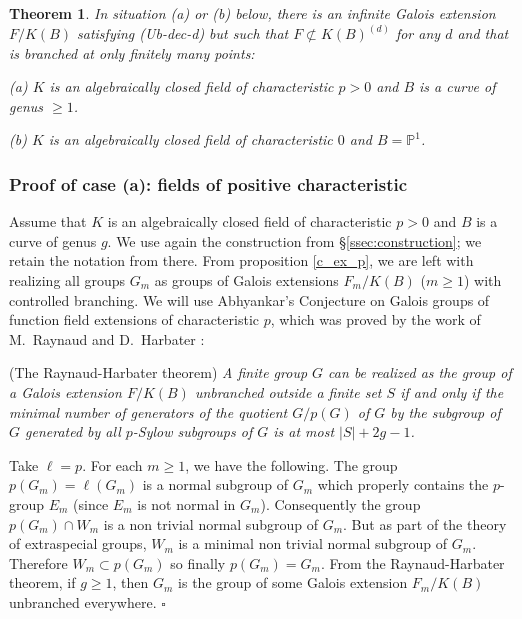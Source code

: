 \documentclass[12pt,english]{amsart}
\newtheorem{theorem}{Theorem}[section]
\newtheorem{twisting lemma}[theorem]{Twisting lemma}
\begin{document}
\begin{theorem}  \label{thm:2-examples}
In situation {\rm (a)} or {\rm (b)} below, there is an infinite Galois extension $F/K(B)$ 
satisfying {\rm (Ub-dec-d)} but  such that $F\not\subset K(B)^{(d)}$ for any $d$ and that is branched at only finitely many points:
\vskip 1mm

\noindent
{\rm (a)} $K$ is an algebraically closed field of characteristic $p>0$ and $B$ is a curve of genus
$\geq 1$.
\vskip 1mm

\noindent
{\rm (b)} $K$ is an algebraically closed field of characteristic $0$ and $B={\mathbb{P}}^1$.
\end{theorem}

\subsubsection{Proof of case (a): fields of positive characteristic}
Assume that $K$ is an alge\-bra\-ical\-ly closed field of characteristic $p>0$ and $B$ is a curve of genus $g$. We use again the construction from \S \ref{ssec:construction}; we retain the notation from there. From proposition \ref{c_ex_p}, 
we are left with realizing all groups $G_m$ as groups of Galois extensions
$F_m/K(B)$ ($m\geq 1$) with controlled branching. 
We will 
use Abhyankar\rq{}s Conjecture on Galois groups of function field extensions of characteristic $p$, which was proved by the work of M.~Raynaud \cite{raynaud} and D.~Harbater \cite{harbater}:
\vskip 2mm

\noindent
{(The Raynaud-Harbater theorem)} {\it A finite group $G$ can be realized as the group of a Galois extension $F/K(B)$ unbranched outside a finite set $S$ if and only if the minimal number of generators of the quotient $G/p(G)$ of $G$ by the subgroup of $G$ generated by all $p$-Sylow subgroups of $G$ is at most $|S|+2g-1$.}

\vskip 2mm

Take $\ell = p$.  
For each $m\geq 1$, we have the following. The group $p(G_m)=\ell(G_m)$ is a normal subgroup of $G_m$ which properly contains the $p$-group $E_m$ (since $E_m$ is not normal in $G_m$). Consequently the group $p(G_m)\cap W_m$ is a non trivial normal subgroup 
of $G_m$. 
But as part of the theory of extraspecial groups, $W_m$ is a minimal non trivial normal subgroup of $G_m$. Therefore $W_m\subset p(G_m)$ so finally $p(G_m)=G_m$. 
From the Raynaud-Harbater theorem, if $g\geq 1$, then $G_m$ is the group of some Galois extension $F_m/K(B)$ 
unbranched everywhere. $\square$
\end{document}
